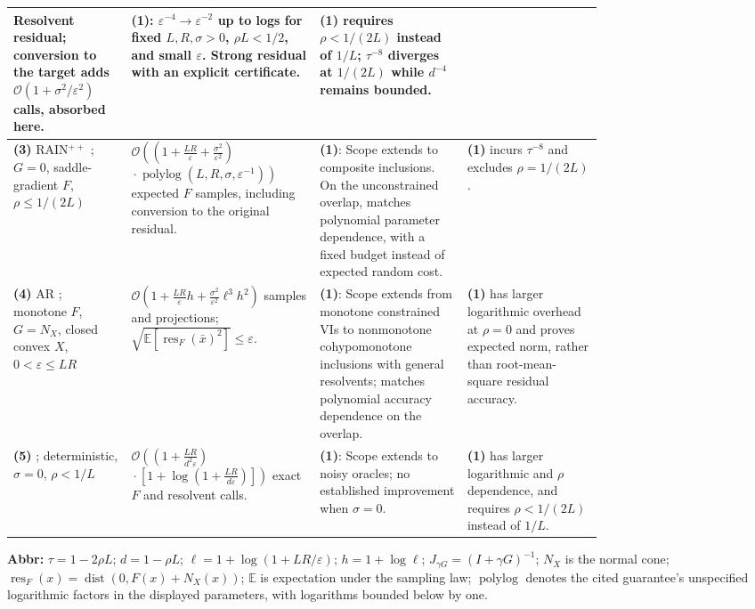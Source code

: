 \begin{table}[tp]
\begin{threeparttable}
\begin{tabularx}{\linewidth}{@{}>{\raggedright\arraybackslash}p{0.20\linewidth}>{\raggedright\arraybackslash}p{0.32\linewidth}>{\raggedright\arraybackslash}p{0.25\linewidth}>{\raggedright\arraybackslash}X@{}}
Resolvent residual; conversion to the target adds $\mathcal{O}(1+\sigma^2/\varepsilon^2)$ calls, absorbed here.
& \textbf{(1)}: $\varepsilon^{-4}\to\varepsilon^{-2}$ up to logs for fixed $L,R,\sigma>0$, $\rho L<1/2$, and small $\varepsilon$. Strong residual with an explicit certificate.
& \textbf{(1)} requires $\rho<1/(2L)$ instead of $1/L$; $\tau^{-8}$ diverges at $1/(2L)$ while $d^{-4}$ remains bounded. \\
\midrule
\textbf{(3)} RAIN$^{++}$ \citep[Thm.~5.4, Prop.~5.3]{sciChenLuo2024v4}; $G=0$, saddle-gradient $F$, $\rho\le1/(2L)$
& $\mathcal{O}\!\left(\left(1+\frac{LR}{\varepsilon}+\frac{\sigma^2}{\varepsilon^2}\right)\right.$\newline
$\left.{}\cdot\operatorname{polylog}(L,R,\sigma,\varepsilon^{-1})\right)$ expected $F$ samples, including conversion to the original residual.
& \textbf{(1)}: Scope extends to composite inclusions. On the unconstrained overlap, matches polynomial parameter dependence, with a fixed budget instead of expected random cost.
& \textbf{(1)} incurs $\tau^{-8}$ and excludes $\rho=1/(2L)$. \\
\midrule
\textbf{(4)} AR \citep[Thm.~2.2]{sciJiLanZhu2026v2}; monotone $F$, $G=N_X$, closed convex $X$, $0<\varepsilon\le LR$
& $\mathcal{O}\!\left(1+\frac{LR}{\varepsilon}h+\frac{\sigma^2}{\varepsilon^2}\ell^3h^2\right)$ samples and projections; $\sqrt{\mathbb{E}[\operatorname{res}_F(\bar x)^2]}\le\varepsilon$.
& \textbf{(1)}: Scope extends from monotone constrained VIs to nonmonotone cohypomonotone inclusions with general resolvents; matches polynomial accuracy dependence on the overlap.
& \textbf{(1)} has larger logarithmic overhead at $\rho=0$ and proves expected norm, rather than root-mean-square residual accuracy. \\
\midrule
\textbf{(5)} \citep[Thm.~2.1, Cor.~2.2]{cohypAKWv3}; deterministic, $\sigma=0$, $\rho<1/L$
& $\mathcal{O}\!\left(\left(1+\frac{LR}{d^2\varepsilon}\right)\right.$\newline
$\left.{}\cdot\left[1+\log\!\left(1+\frac{LR}{d\varepsilon}\right)\right]\right)$ exact $F$ and resolvent calls.
& \textbf{(1)}: Scope extends to noisy oracles; no established improvement when $\sigma=0$.
& \textbf{(1)} has larger logarithmic and $\rho$ dependence, and requires $\rho<1/(2L)$ instead of $1/L$. \\
\bottomrule
\end{tabularx}
\begin{tablenotes}[flushleft]\footnotesize
\item[] \textbf{Abbr:} $\tau=1-2\rho L$; $d=1-\rho L$; $\ell=1+\log(1+LR/\varepsilon)$; $h=1+\log\ell$; $J_{\gamma G}=(I+\gamma G)^{-1}$; $N_X$ is the normal cone; $\operatorname{res}_F(x)=\operatorname{dist}(0,F(x)+N_X(x))$; $\mathbb{E}$ is expectation under the sampling law; $\operatorname{polylog}$ denotes the cited guarantee's unspecified logarithmic factors in the displayed parameters, with logarithms bounded below by one.

\end{tablenotes}
\end{threeparttable}
\end{table}
